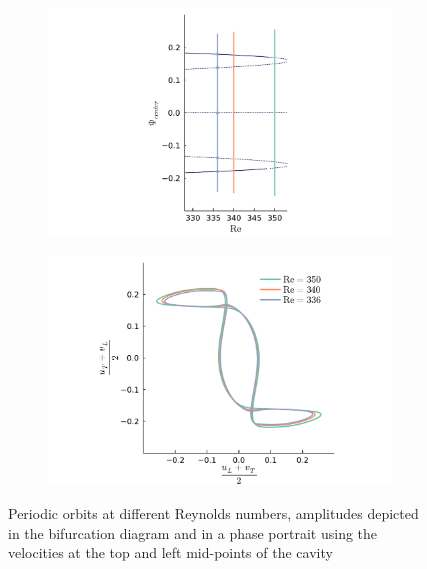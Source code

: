 \begin{figure}[!h]
  \begin{subfigure}[b]{0.42\textwidth}
  \centering
  \includegraphics[trim={3cm 0 4.6cm 0},clip,width=\textwidth]{figs/orbits_bif_diag64x64.pdf}
  \end{subfigure}
  \begin{subfigure}[b]{0.58\textwidth}
  \centering
  \includegraphics[trim={1cm 0cm 1cm 0cm},clip,width=\textwidth]{figs/orbits64x64.pdf}
  \end{subfigure}
  \caption{Periodic orbits at different Reynolds numbers, amplitudes depicted
    in the bifurcation diagram and in a phase portrait using the velocities at
    the top and left mid-points of the cavity} 
  \label{fig:orbits}
\end{figure}

